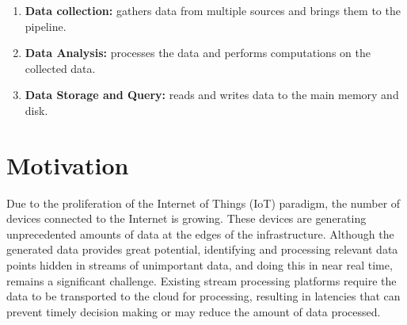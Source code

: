 \begin{enumerate}
\item \textbf{Data collection:} gathers data from multiple sources and brings them to the pipeline.
\item \textbf{Data Analysis:} processes the data and performs computations on the collected data.   
\item \textbf{Data Storage and Query:} reads and writes data to the main memory and disk.
\end{enumerate}

\section{Motivation}

Due to the proliferation of the Internet of Things (IoT) paradigm, the number of devices connected to the Internet is growing. These devices are generating unprecedented amounts of data at the edges of the infrastructure. Although the generated data provides great potential, identifying and processing relevant data points hidden in streams of unimportant data, and doing this in near real time, remains a significant challenge. Existing stream processing platforms require the data to be transported to the cloud for processing, resulting in latencies that can prevent timely decision making or may reduce the amount of data processed.

